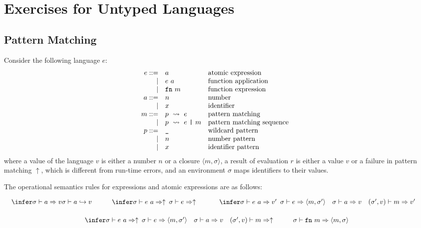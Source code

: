 \setchapterpreamble[u]{\margintoc}
\chapter{Exercises for Untyped Languages}

\newcommand{\mtt}[1]{\texttt{#1}}
\newcommand{\valnp}{\ensuremath{\embox{val}}}
\newcommand{\Space}[1]{\vspace{#1ex}}

\section{Pattern Matching}
Consider the following language $e$:
\[
\begin{array}{rll}
e ::= & a& \mbox{atomic expression}\\
\mid& e\ a& \mbox{function application}\\
\mid& \verb!fn!\ m& \mbox{function expression}\\
a ::= & n & \mbox{number}\\
\mid&x & \mbox{identifier}\\
m ::= & p\ \leadsto\ e & \mbox{pattern matching}\\
\mid& p\ \leadsto\ e\ \verb!|!\ m & \mbox{pattern matching sequence}\\
p ::= & \verb!_! & \mbox{wildcard pattern}\\
\mid&n& \mbox{number pattern}\\
\mid&x& \mbox{identifier pattern}
\end{array}
\]
where a value of the language $v$ is either a number $n$ or a closure $\langle m, \sigma\rangle$,
a result of evaluation $r$ is either a value $v$ or a failure in pattern matching $\uparrow$,
which is different from run-time errors,
and an environment $\sigma$ maps identifiers to their values.

The operational semantics rules for expressions and atomic expressions are as follows:

\[
\begin{array}{c}
\derive{\sigma \vdash a \Rightarrow v}{
\sigma \vdash a \hookrightarrow v
}
\qquad
\derive{\sigma \vdash e\ a \Rightarrow \uparrow}
{\begin{array}{c}
\sigma \vdash e \Rightarrow \uparrow
\end{array}
}
\qquad
\derive{\sigma \vdash e\ a \Rightarrow v'}
{\begin{array}{c}
\sigma \vdash e \Rightarrow \langle m, \sigma' \rangle \quad
\sigma \vdash a \Rightarrow v \quad
(\sigma', v) \vdash m \Rightarrow v'
\end{array}
}
\\[1.5em]
\derive{\sigma \vdash e\ a \Rightarrow \uparrow}
{\begin{array}{c}
\sigma \vdash e \Rightarrow \langle m, \sigma' \rangle \quad
\sigma \vdash a \Rightarrow v \quad
(\sigma', v) \vdash m \Rightarrow \uparrow
\end{array}
}
\qquad
\sigma \vdash \mtt{fn}\ m \Rightarrow \langle m, \sigma \rangle
\end{array}
\]

